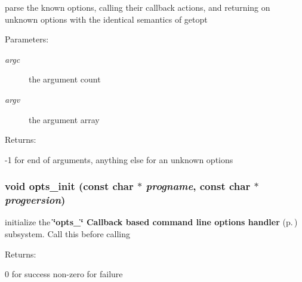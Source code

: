 parse the known options, calling their callback actions, and returning on unknown options with the identical semantics of getopt

\begin{Desc}
\item[Parameters: ]\par
\begin{description}
\item[{\em 
argc}]the argument count \item[{\em 
argv}]the argument array \end{description}
\end{Desc}
\begin{Desc}
\item[Returns: ]\par
-1 for end of arguments, anything else for an unknown options \end{Desc}
\subsubsection{\setlength{\rightskip}{0pt plus 5cm}void opts\_\-init (const char $\ast$ {\em progname}, const char $\ast$ {\em progversion})}\label{group__opts_a0}


initialize the {\bf \char`\"{}opts\_\-\char`\"{} Callback based command line options handler} {\rm (p.\,\pageref{group__opts})} subsystem. Call this before calling

\begin{Desc}
\item[Returns: ]\par
0 for success non-zero for failure \end{Desc}
